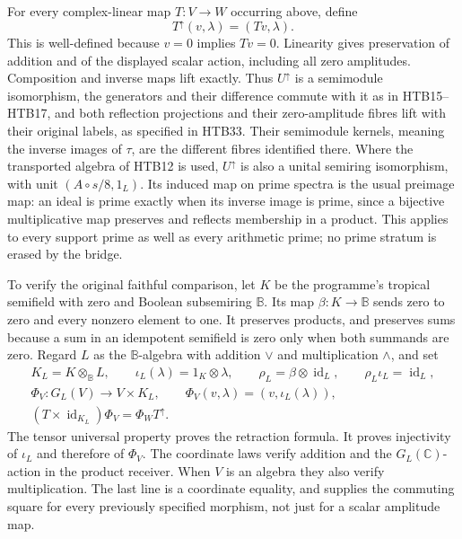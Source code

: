 For every complex-linear map $T:V\to W$ occurring above, define
\begin{equation}\tag{HTB30}
 T^{\uparrow}(v,\lambda)=(Tv,\lambda).
\end{equation}
This is well-defined because $v=0$ implies $Tv=0$. Linearity gives
preservation of addition and of the displayed scalar action, including
all zero amplitudes. Composition and inverse maps lift exactly. Thus
$U^{\uparrow}$ is a semimodule isomorphism, the generators and their
difference commute with it as in HTB15--HTB17, and both reflection
projections and their zero-amplitude fibres lift with their original
labels, as specified in HTB33. Their semimodule kernels, meaning the
inverse images of $\tau$, are the different fibres identified there.
Where the transported algebra of HTB12 is used, $U^{\uparrow}$ is
also a unital semiring isomorphism, with unit
$(A\circ s/8,1_L)$. Its induced map on prime spectra is the usual
preimage map: an ideal is prime exactly when its inverse image is
prime, since a bijective multiplicative map preserves and reflects
membership in a product. This applies to every support prime as well
as every arithmetic prime; no prime stratum is erased by the bridge.

To verify the original faithful comparison, let $K$ be the programme's
tropical semifield with zero and Boolean subsemiring $\mathbb B$.
Its map $\beta:K\to\mathbb B$ sends zero to zero and every nonzero
element to one. It preserves products, and preserves sums because a
sum in an idempotent semifield is zero only when both summands are
zero. Regard $L$ as the $\mathbb B$-algebra with addition $\vee$ and
multiplication $\wedge$, and set
\begin{equation}\tag{HTB31}
\begin{gathered}
 K_L=K\otimes_{\mathbb B}L,\qquad
 \iota_L(\lambda)=1_K\otimes\lambda,\qquad
 \rho_L=\beta\otimes\operatorname{id}_L,\qquad
 \rho_L\iota_L=\operatorname{id}_L,\\
 \Phi_V:G_L(V)\longrightarrow V\times K_L,\qquad
 \Phi_V(v,\lambda)=(v,\iota_L(\lambda)),\\
 (T\times\operatorname{id}_{K_L})\Phi_V
       =\Phi_W T^{\uparrow}.
\end{gathered}
\end{equation}
The tensor universal property proves the retraction formula. It proves
injectivity of $\iota_L$ and therefore of $\Phi_V$. The coordinate
laws verify addition and the $G_L(\mathbb C)$-action in the product
receiver. When $V$ is an algebra they also verify multiplication.
The last line is a coordinate equality, and supplies the commuting
square for every previously specified morphism, not just for a
scalar amplitude map.

